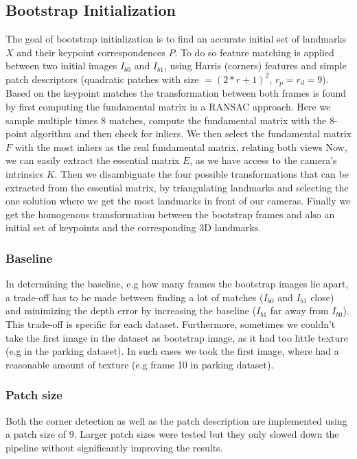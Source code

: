 \documentclass[letterpaper, 12 pt]{article}
\begin{document}
\begin{multicols*}{2}
\subsection{Bootstrap Initialization}
The goal of bootstrap initialization is to find an accurate  initial set of landmarks $X$ and their keypoint correspondences $P$. To do so feature matching is applied between two initial images $I_{b0}$ and $I_{b1}$, using Harris (corners) features and simple patch descriptors (quadratic patches with size $= (2*r + 1)^2$, $r_p = r_d = 9$). Based on the keypoint matches the transformation between both frames is found by first computing the fundamental matrix in a RANSAC approach. Here we sample multiple times 8 matches, compute the fundamental matrix with the 8-point algorithm and then check for inliers. We then select the fundamental matrix $F$ with the most inliers as the real fundamental matrix, relating both views Now, we can easily extract the essential matrix $E$, as we have access to the camera's intrinsics $K$. Then we disambiguate the four possible transformations that can be extracted from the essential matrix, by triangulating landmarks and selecting the one solution where we get the most landmarks in front of our cameras. Finally we get the homogenous transformation between the bootstrap frames and also an initial set of keypoints and the corresponding 3D landmarks.

\subsubsection{Baseline}
In determining the baseline, e.g how many frames the bootstrap images lie apart, a trade-off has to be made between finding a lot of matches ($I_{b0}$ and $I_{b1}$ close) and minimizing the depth error by increasing the baseline ($I_{b1}$ far away from $I_{b0}$). This trade-off is specific for each dataset. Furthermore, sometimes we couldn't take the first image in the dataset as bootstrap image, as it had too little texture (e.g in the parking dataset). In such cases we took the first image, where had a reasonable amount of texture (e.g frame 10 in parking dataset).

\subsubsection{Patch size}
Both the corner detection as well as the patch description are implemented using a patch size of $9$. Larger patch sizes were tested but they only slowed down the pipeline without significantly improving the results. 


\end{multicols*}
\end{document}
